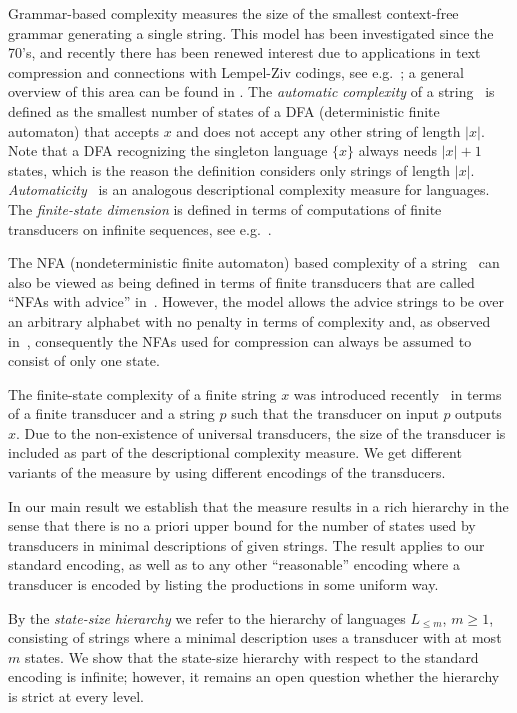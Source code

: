 \documentclass[copyright]{eptcs}
\begin{document}
Grammar-based complexity measures the size of the smallest
context-free grammar generating a single string.
This model has been investigated since the 70's, and
recently there has been renewed interest 
due to applications in text compression and 
connections with Lempel-Ziv codings,
see e.g.~\cite{LS,Ry2}; a general overview
of this area can be found in
\cite{Le}. 
The {\em automatic complexity\/} of a string~\cite{SW} is
defined as the smallest
number of states of a DFA (deterministic finite
automaton) that accepts $x$ and does not accept any
other string of length 
$|x|$. Note that a DFA  recognizing the singleton language
$\{ x \}$  always needs  $|x| + 1$ states, which is the reason
 the definition considers only strings of length $|x|$. 
{\em Automaticity\/}~\cite{AS,SB} is an analogous descriptional
complexity measure for languages.
The {\em finite-state dimension\/} is defined in terms
of computations of finite transducers on infinite
sequences, see e.g.~\cite{BHV,DLN}.


The  NFA (nondeterministic finite automaton)
based complexity 
of a string~\cite{CLL} can also be viewed as being defined in terms of finite
transducers that are called  ``NFAs with advice''
in~\cite{CLL}.
However, the model allows the advice
strings to be over an arbitrary alphabet with no penalty
in terms of complexity and, as observed in~\cite{CLL},
consequently the NFAs used for compression can always be
assumed to consist of only one state.


The finite-state complexity of a finite string $x$
was introduced recently~\cite{CSR} 
in terms of a finite transducer and a string $p$
such that the transducer on input $p$ outputs $x$.
Due to the non-existence of  universal 
transducers, the size of the transducer is
included as part of the descriptional complexity 
measure. We get different variants of the measure
by using different encodings of the transducers.

In our main result we establish that the measure results in
a rich hierarchy in the sense that
there is no a priori
upper bound for the number of states used by transducers
in  minimal descriptions of given strings.
The result applies to our
standard encoding, as well as to any other ``reasonable'' encoding
where a transducer is encoded by listing the productions
in some uniform way.

By the {\em state-size hierarchy\/} we refer to the
hierarchy of languages $L_{\leq m}$, $m \geq 1$,
consisting of strings where a minimal description uses
a transducer with at most $m$ states. We show that the
state-size hierarchy with respect to the standard encoding
is infinite; however, it remains an open question whether
the hierarchy is strict at every level.
\end{document}
